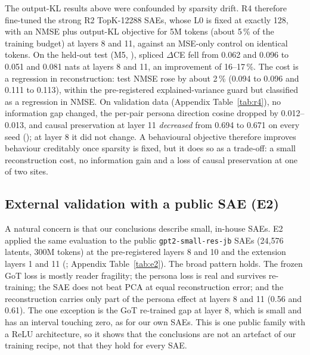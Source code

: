The output-KL results above were confounded by sparsity drift. R4 therefore fine-tuned the strong R2 TopK-12288 SAEs,
whose L0 is fixed at exactly 128, with an NMSE plus output-KL objective \citep{karvonen2025kl,braun2024e2e} for 5M
tokens (about 5\,\% of the training budget) at layers 8 and 11, against an MSE-only control on identical tokens. On the
held-out test (M5, ), spliced $\Delta$CE fell from 0.062 and 0.096 to 0.051 and 0.081 nats at
layers 8 and 11, an improvement of 16--17\,\%. The cost is a regression in reconstruction: test NMSE rose by about 2\,\%
(0.094 to 0.096 and 0.111 to 0.113), within the pre-registered explained-variance guard but classified as a regression
in NMSE. On validation data (Appendix Table~\ref{tab:r4}), no information gap changed, the per-pair persona
direction cosine dropped by 0.012--0.013, and causal preservation at layer 11 \emph{decreased} from 0.694 to 0.671 on
every seed (); at layer 8 it did not change. A behavioural objective therefore improves behaviour
creditably once sparsity is fixed, but it does so as a trade-off: a small reconstruction cost, no information gain and
a loss of causal preservation at one of two sites.

\subsection{External validation with a public SAE (E2)}\label{sec:e2}

A natural concern is that our conclusions describe small, in-house SAEs. E2 applied the same evaluation to the public
\texttt{gpt2-small-res-jb} SAEs (24{,}576 latents, 300M tokens) at the pre-registered layers 8 and 10 and the
extension layers 1 and 11 (; Appendix Table~\ref{tab:e2}). The broad pattern holds. The frozen GoT
loss is mostly reader fragility; the persona loss is real and survives re-training; the SAE does not beat PCA at equal
reconstruction error; and the reconstruction carries only part of the persona effect at layers 8 and 11 (0.56 and
0.61). The one exception is the GoT re-trained gap at layer 8, which is small and has an interval touching zero, as for
our own SAEs. This is one public family with a ReLU architecture, so it shows that the conclusions are not an artefact
of our training recipe, not that they hold for every SAE.

